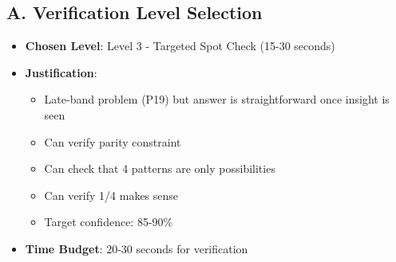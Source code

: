 \documentclass[12pt]{article}
\begin{document}
\begin{verificationbox}
\subsection*{A. Verification Level Selection}
\begin{itemize}[leftmargin=*]
    \item \textbf{Chosen Level}: Level 3 - Targeted Spot Check (15-30 seconds)
    \item \textbf{Justification}: 
    \begin{itemize}
        \item Late-band problem (P19) but answer is straightforward once insight is seen
        \item Can verify parity constraint
        \item Can check that 4 patterns are only possibilities
        \item Can verify 1/4 makes sense
        \item Target confidence: 85-90\%
    \end{itemize}
    \item \textbf{Time Budget}: 20-30 seconds for verification
\end{itemize}


\end{verificationbox}
\end{document}
